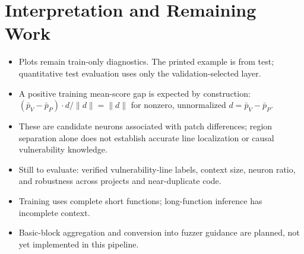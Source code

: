 \documentclass[12pt]{article}
\begin{document}
\section{Interpretation and Remaining Work}
\begin{itemize}
    \item Plots remain train-only diagnostics. The printed example is from test; quantitative test evaluation uses only the validation-selected layer.
    \item A positive training mean-score gap is expected by construction:
    $(\bar p_V-\bar p_P)\cdot d/\|d\|=\|d\|$ for nonzero, unnormalized $d=\bar p_V-\bar p_P$.
    \item These are candidate neurons associated with patch differences; region separation alone does not establish accurate line localization or causal vulnerability knowledge.
    \item Still to evaluate: verified vulnerability-line labels, context size, neuron ratio, and robustness across projects and near-duplicate code.
    \item Training uses complete short functions; long-function inference has incomplete context.
    \item Basic-block aggregation and conversion into fuzzer guidance are planned, not yet implemented in this pipeline.
\end{itemize}
\end{document}
